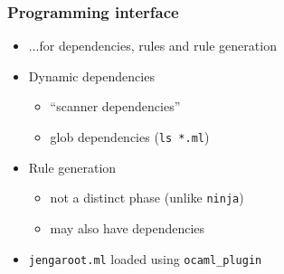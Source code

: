 \documentclass{beamer}
\begin{document}

%
%
%


\begin{frame}[fragile]
\frametitle{Programming interface}
\begin{itemize}
\item ...for dependencies, rules and rule generation
\item Dynamic dependencies
\begin{itemize}
\item ``scanner dependencies''
\item glob dependencies ({\tt ls *.ml})
\end{itemize}
\item Rule generation
\begin{itemize}
\item not a distinct phase (unlike {\tt ninja})
\item may also have dependencies
\end{itemize}
\item {\tt jengaroot.ml} loaded using {\tt ocaml\_plugin}
\end{itemize}
\end{frame}



%
%
\end{document}
